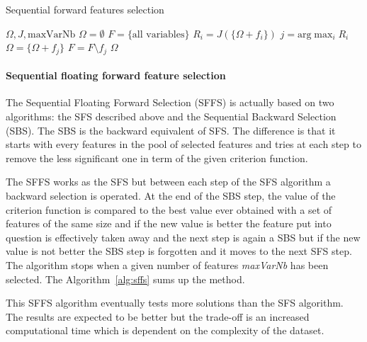 \documentclass[journal,peerreview,onecolumn]{IEEEtran}
\begin{document}
            \begin{algorithm}
            \caption{Sequential forward features selection\label{alg:sfs}}
            {\footnotesize
            \begin{algorithmic}[1]
            \REQUIRE $\Omega,J,\text{maxVarNb}$
            \STATE $\Omega=\emptyset$
            \STATE $F=\text{\{all variables\}}$
            \STATE $R_i = J(\{\Omega + f_i\})$
            \ENDFOR
            \STATE $j=\text{arg} \max_{i} R_i$
            \STATE $\Omega = \{\Omega + f_j\}$
            \STATE $F = F \setminus f_j$
            \ENDWHILE
            \RETURN $\Omega$
            \end{algorithmic}
            }
            \end{algorithm}

            \paragraph{Sequential floating forward feature selection}
            \label{sec:floating-presentation}

            The Sequential Floating Forward Selection (SFFS)\cite{somol1999adaptive} is actually based on two algorithms: the SFS described above and the Sequential Backward Selection (SBS). The SBS is the backward equivalent of SFS. The difference is that it starts with every features in the pool of selected features and tries at each step to remove the less significant one in term of the given criterion function.

            The SFFS works as the SFS but between each step of the SFS algorithm a backward selection is operated. At the end of the SBS step, the value of the criterion function is compared to the best value ever obtained with a set of features of the same size and if the new value is better the feature put into question is effectively taken away and the next step is again a SBS but if the new value is not better the SBS step is forgotten and it moves to the next SFS step. The algorithm stops when a given number of features \emph{maxVarNb} has been selected. The Algorithm~\ref{alg:sffs} sums up the method.

            This SFFS algorithm eventually tests more solutions than the SFS algorithm. The results are expected to be better but the trade-off is an increased computational time which is dependent on the complexity of the dataset.
\end{document}
